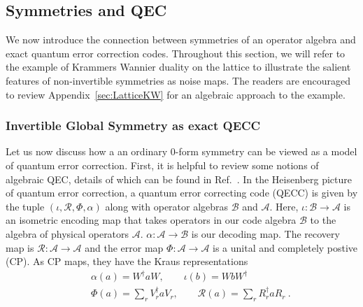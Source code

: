 \documentclass{article}
\newcommand{\mA}{\mathcal{A}}
\newcommand{\mB}{\mathcal{B}}
\theoremstyle{definition}
\newcommand{\SA}[1]{{\color{sulaiman}\footnotesize{(SA) #1}}}
\begin{document}



  \subsection{Symmetries and QEC}

  We now introduce the connection between symmetries of an operator algebra and
  exact quantum error correction codes. Throughout this section, we will refer
  to the example of Krammers Wannier duality on the lattice to illustrate the
  salient features of non-invertible symmetries as noise maps. The readers are encouraged
  to review Appendix~\ref{sec:LatticeKW} for an algebraic approach to the example.

  \subsubsection{Invertible Global Symmetry as exact QECC}

  Let us now discuss how a an ordinary 0-form symmetry can be viewed as a model
  of quantum error correction. First, it is helpful to review some notions of
  algebraic QEC, details of which can be found in Ref.~\cite{furuya2022real}. In
  the Heisenberg picture of quantum error correction, a quantum error correcting
  code (QECC) is given by the tuple $(\iota, \mathcal{R}, \Phi, \alpha)$ along
  with operator algebras $\mathcal{B}$ and $\mathcal{A}$. Here,
  $\iota:\mB\to \mA$ is an isometric encoding map that takes operators in our
  code algebra $\mB$ to the algebra of physical operators $\mA$. $\alpha:\mA\to \mB$
  is our decoding map. The recovery map is $\mathcal{R}:\mA\to \mA$ and the
  error map $\Phi:\mA\to \mA$ is a unital and completely postive (CP). As CP maps,
  they have the Kraus representations
  \begin{eqnarray}
    \label{Krausforms} &&\alpha(a)=W^\dagger a W,\qquad \iota(b)=WbW^\dagger\\
    \
&&\Phi(a)=\sum_r V_r^\dagger a V_r,\qquad \mathcal{R}(a)=\sum_r R_r^\dagger
    a R_r\ .
  \end{eqnarray}
\end{document}
